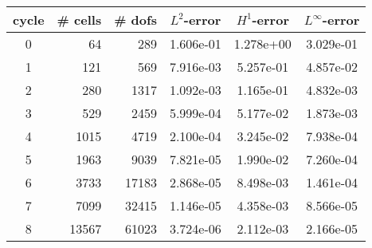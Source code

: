 \documentclass[10pt]{report}
\begin{document}
\begin{table}[H]
\begin{center}
\begin{tabular}{|c|r|r|c|c|c|} \hline
cycle & \# cells & \# dofs & $L^2$-error & $H^1$-error & $L^\infty$-error\\ \hline
0 & 64 & 289 & 1.606e-01 & 1.278e+00 & 3.029e-01\\ \hline
1 & 121 & 569 & 7.916e-03 & 5.257e-01 & 4.857e-02\\ \hline
2 & 280 & 1317 & 1.092e-03 & 1.165e-01 & 4.832e-03\\ \hline
3 & 529 & 2459 & 5.999e-04 & 5.177e-02 & 1.873e-03\\ \hline
4 & 1015 & 4719 & 2.100e-04 & 3.245e-02 & 7.938e-04\\ \hline
5 & 1963 & 9039 & 7.821e-05 & 1.990e-02 & 7.260e-04\\ \hline
6 & 3733 & 17183 & 2.868e-05 & 8.498e-03 & 1.461e-04\\ \hline
7 & 7099 & 32415 & 1.146e-05 & 4.358e-03 & 8.566e-05\\ \hline
8 & 13567 & 61023 & 3.724e-06 & 2.112e-03 & 2.166e-05\\ \hline
\end{tabular}
\end{center}
\end{table}
\end{document}
